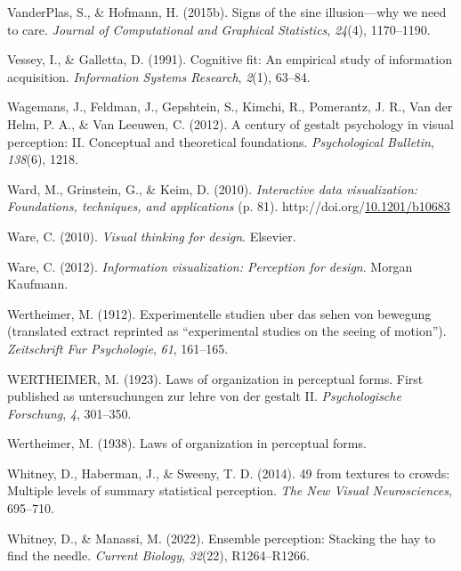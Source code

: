 \documentclass[print]{nuthesis}
\newlength{\cslhangindent}
\newenvironment{CSLReferences}[2]%
{\setlength{\parindent}{0pt}%
\everypar{\setlength{\hangindent}{\cslhangindent}}\ignorespaces}%
{\par}
\begin{document}
\begin{CSLReferences}{1}{0}
\leavevmode{}%
VanderPlas, S., \& Hofmann, H. (2015b). Signs of the sine illusion---why we need to care. \emph{Journal of Computational and Graphical Statistics}, \emph{24}(4), 1170--1190.

\leavevmode{}%
Vessey, I., \& Galletta, D. (1991). Cognitive fit: An empirical study of information acquisition. \emph{Information Systems Research}, \emph{2}(1), 63--84.

\leavevmode{}%
Wagemans, J., Feldman, J., Gepshtein, S., Kimchi, R., Pomerantz, J. R., Van der Helm, P. A., \& Van Leeuwen, C. (2012). A century of gestalt psychology in visual perception: II. Conceptual and theoretical foundations. \emph{Psychological Bulletin}, \emph{138}(6), 1218.

\leavevmode{}%
Ward, M., Grinstein, G., \& Keim, D. (2010). \emph{Interactive data visualization: Foundations, techniques, and applications} (p. 81). http://doi.org/\href{https://doi.org/10.1201/b10683}{10.1201/b10683}

\leavevmode{}%
Ware, C. (2010). \emph{Visual thinking for design}. Elsevier.

\leavevmode{}%
Ware, C. (2012). \emph{Information visualization: Perception for design}. Morgan Kaufmann.

\leavevmode{}%
Wertheimer, M. (1912). Experimentelle studien uber das sehen von bewegung (translated extract reprinted as {``experimental studies on the seeing of motion''}). \emph{Zeitschrift Fur Psychologie}, \emph{61}, 161--165.

\leavevmode{}%
WERTHEIMER, M. (1923). Laws of organization in perceptual forms. First published as untersuchungen zur lehre von der gestalt II. \emph{Psychologische Forschung}, \emph{4}, 301--350.

\leavevmode{}%
Wertheimer, M. (1938). Laws of organization in perceptual forms.

\leavevmode{}%
Whitney, D., Haberman, J., \& Sweeny, T. D. (2014). 49 from textures to crowds: Multiple levels of summary statistical perception. \emph{The New Visual Neurosciences}, 695--710.

\leavevmode{}%
Whitney, D., \& Manassi, M. (2022). Ensemble perception: Stacking the hay to find the needle. \emph{Current Biology}, \emph{32}(22), R1264--R1266.


\end{CSLReferences}
\end{document}
